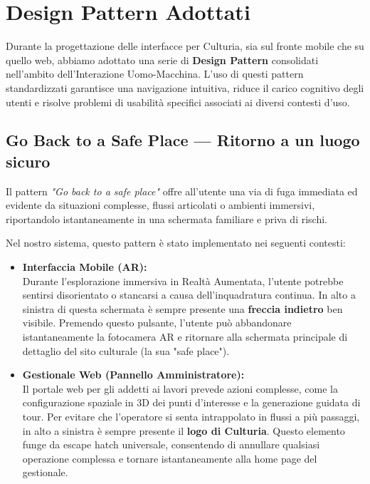 \section{Design Pattern Adottati}

Durante la progettazione delle interfacce per Culturia, sia sul fronte mobile che su quello web, abbiamo adottato una serie di \textbf{Design Pattern} consolidati nell'ambito dell'Interazione Uomo-Macchina. L'uso di questi pattern standardizzati garantisce una navigazione intuitiva, riduce il carico cognitivo degli utenti e risolve problemi di usabilità specifici associati ai diversi contesti d'uso.

\subsection[Go Back to a Safe Place]{Go Back to a Safe Place --- Ritorno a un luogo sicuro}
Il pattern \textit{"Go back to a safe place"} offre all'utente una via di fuga immediata ed evidente da situazioni complesse, flussi articolati o ambienti immersivi, riportandolo istantaneamente in una schermata familiare e priva di rischi.

Nel nostro sistema, questo pattern è stato implementato nei seguenti contesti:
\begin{itemize}[leftmargin=1.5em]
    \item \textbf{Interfaccia Mobile (AR):}\\
    Durante l'esplorazione immersiva in Realtà Aumentata, l'utente potrebbe sentirsi disorientato o stancarsi a causa dell'inquadratura continua. In alto a sinistra di questa schermata è sempre presente una \textbf{freccia indietro} ben visibile. Premendo questo pulsante, l'utente può abbandonare istantaneamente la fotocamera AR e ritornare alla schermata principale di dettaglio del sito culturale (la sua "safe place").
    
    \item \textbf{Gestionale Web (Pannello Amministratore):}\\
    Il portale web per gli addetti ai lavori prevede azioni complesse, come la configurazione spaziale in 3D dei punti d'interesse e la generazione guidata di tour. Per evitare che l'operatore si senta intrappolato in flussi a più passaggi, in alto a sinistra è sempre presente il \textbf{logo di Culturia}. Questo elemento funge da escape hatch universale, consentendo di annullare qualsiasi operazione complessa e tornare istantaneamente alla home page del gestionale.
\end{itemize}

